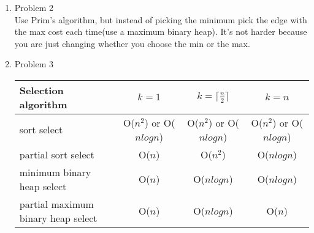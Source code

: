 \documentclass[11pt]{article}
\begin{document}
\begin{enumerate}
\begin{enumerate}
\end{enumerate}
\item Problem 2\\
Use Prim's algorithm, but instead of picking the minimum pick the edge with the max cost each time(use a maximum binary heap). It's not harder because you are just changing whether you choose the min or the max.
\item Problem 3\\
\begin{tabular}{l||c|c|c}
Selection algorithm&$k=1$ & $k=\lceil \frac{n}{2} \rceil$& $k=n$\\\hline \hline
sort select& O($n^2$) or O($nlogn$)& O($n^2$) or O($nlogn$) &O($n^2$) or O($nlogn$)\\\hline
partial sort select& O($n$) & O($n^2$) & O($nlogn$)\\\hline
minimum binary heap select&  O($n$)& O($nlogn$)  & O($nlogn$)\\\hline
partial maximum binary heap select & O($n$) &O($nlogn$) &O($n$) 
\end{tabular}
\end{enumerate}
\end{document}
